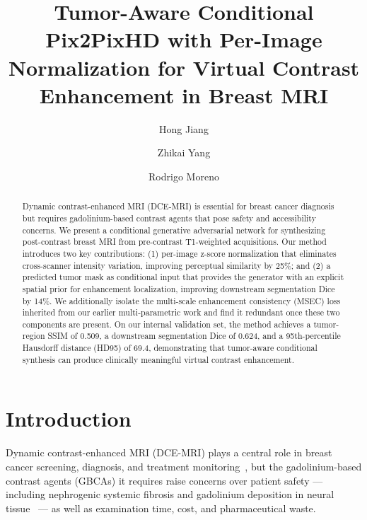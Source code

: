 \documentclass[runningheads,a4paper]{llncs}
\begin{document}
\title{Tumor-Aware Conditional Pix2PixHD with Per-Image Normalization for Virtual Contrast Enhancement in Breast MRI}
\author{Hong Jiang \and Zhikai Yang \and Rodrigo Moreno}
\maketitle

\begin{abstract}
Dynamic contrast-enhanced MRI (DCE-MRI) is essential for breast cancer diagnosis but requires gadolinium-based contrast agents that pose safety and accessibility concerns. We present a conditional generative adversarial network for synthesizing post-contrast breast MRI from pre-contrast T1-weighted acquisitions. Our method introduces two key contributions: (1) per-image z-score normalization that eliminates cross-scanner intensity variation, improving perceptual similarity by 25\%; and (2) a predicted tumor mask as conditional input that provides the generator with an explicit spatial prior for enhancement localization, improving downstream segmentation Dice by 14\%. We additionally isolate the multi-scale enhancement consistency (MSEC) loss inherited from our earlier multi-parametric work and find it redundant once these two components are present. On our internal validation set, the method achieves a tumor-region SSIM of 0.509, a downstream segmentation Dice of 0.624, and a 95th-percentile Hausdorff distance (HD95) of 69.4, demonstrating that tumor-aware conditional synthesis can produce clinically meaningful virtual contrast enhancement.
\end{abstract}

\section{Introduction}
Dynamic contrast-enhanced MRI (DCE-MRI) plays a central role in breast cancer screening, diagnosis, and treatment monitoring~\cite{mann2019breast}, but the gadolinium-based contrast agents (GBCAs) it requires raise concerns over patient safety --- including nephrogenic systemic fibrosis and gadolinium deposition in neural tissue~\cite{kanda2014gadolinium} --- as well as examination time, cost, and pharmaceutical waste.
\end{document}
